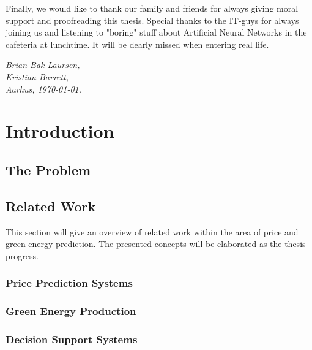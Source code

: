 \documentclass[twoside,11pt,openright]{report}
\begin{document}
Finally, we would like to thank our family and friends for always giving moral support and proofreading this thesis. Special thanks to the IT-guys for always joining us and listening to "boring" stuff about Artificial Neural Networks in the cafeteria at lunchtime. It will be dearly missed when entering real life.

\vspace{2ex}
\begin{flushright}
  \emph{Brian Bak Laursen,}\\
  \emph{Kristian Barrett,}\\
  \emph{Aarhus, \today.}
\end{flushright}

\tableofcontents
{}
\setcounter{secnumdepth}{2}


\chapter{Introduction}
\label{ch:intro}
\section{The Problem}

\section{Related Work}
This section will give an overview of related work within the area of price and green energy prediction. The presented concepts will be elaborated as the thesis progress.
\subsection{Price Prediction Systems}


\subsection{Green Energy Production}
\label{sec:greeEnergyProductionIntroduction}



\subsection{Decision Support Systems}

\end{document}
